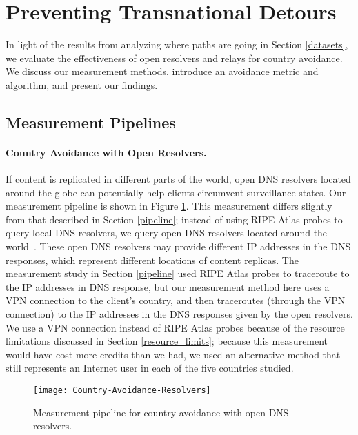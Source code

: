 \section{Preventing Transnational Detours}
\label{avoid_results}
In light of the results from analyzing where paths are going in Section \ref{datasets}, we evaluate the effectiveness of open resolvers and relays for country avoidance.  We discuss our measurement methods, introduce an avoidance metric and algorithm, and present our findings.

\subsection{Measurement Pipelines}
\label{avoid_pipelines}

\paragraph{Country Avoidance with Open Resolvers.} If content is replicated in different parts of the world, open DNS resolvers located around the globe can potentially help clients circumvent surveillance states.  Our measurement pipeline is shown in Figure \ref{fig:avoidance_resolvers}.  This measurement differs slightly from that described in Section \ref{pipeline}; instead of using RIPE Atlas probes to query local DNS resolvers, we query open DNS resolvers located around the world~\cite{open_resolver_list}.  These open DNS resolvers may provide different IP addresses in the DNS responses, which represent different locations of content replicas. The measurement study in Section \ref{pipeline} used RIPE Atlas probes to traceroute to the IP addresses in DNS response, but our measurement method here uses a VPN connection to the client's country, and then traceroutes (through the VPN connection) to the IP addresses in the DNS responses given by the open resolvers.  We use a VPN connection instead of RIPE Atlas probes because of the resource limitations discussed in Section \ref{resource_limits}; because this measurement would have cost more credits than we had, we used an alternative method that still represents an Internet user in each of the five countries studied.

\begin{figure}[t]
\centering
\texttt{[image: Country-Avoidance-Resolvers]}
\caption{Measurement pipeline for country avoidance with open DNS resolvers.}
\label{fig:avoidance_resolvers}
\end{figure}

